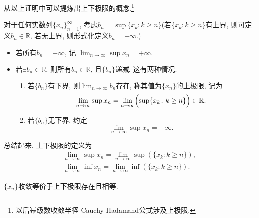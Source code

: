从以上证明中可以提炼出上下极限的概念.\footnote{以后幂级数收敛半径 Cauchy-Hadamand公式涉及上极限.}
\begin{definition}
    对于任何实数列$\{ x_n \}_{n=1}^{\infty}$, 考虑$b_n = \sup \{ x_k\colon k\ge n \}$(若$\{ x_k \colon k\ge n \}$有上界, 则可定义$b_n \in \mathbb{R}$, 若无上界, 则形式化定义$b_n = +\infty$.)
    \begin{itemize}
        \item 若所有$b_n = +\infty$, 记 $\displaystyle  \lim_{n \to \infty} \sup x_n = +\infty$.
        \item 若$\exists  b_n \in  \mathbb{R}$, 则所有$b_n \in  \mathbb{R}$, 且$\{ b_n \}$递减. 这有两种情况.
        \begin{enumerate}
            \item 若$\{ b_n \}$有下界, 则$\displaystyle \lim_{n \to \infty} b_n$存在, 称其值为$\{ x_n \}$的上极限, 记为
            \begin{equation}
              \lim_{n \to \infty} \sup x_n = \lim_{n \to \infty} \Bigl( \sup \{ x_k \colon k\ge n \} \Bigr) \in  \mathbb{R}.
            \end{equation}

            \item 若$\{ b_n \}$无下界, 约定
            \begin{equation}
              \lim_{n \to \infty} \sup x_n = -\infty.
            \end{equation}
        \end{enumerate}
    \end{itemize}
    总结起来, 上下极限的定义为
    \begin{gather}
        \lim_{n \to \infty} \sup x_n = \lim_{n \to \infty} \sup \left( \{ x_k \colon k\ge n \} \right) ,
        \\
        \lim_{n \to \infty} \inf x_n = \lim_{n \to \infty} \inf \left( \{ x_k \colon k\ge n \} \right) .
    \end{gather}
\end{definition}

\begin{proposition}
    $\{ x_n \}$收敛等价于上下极限存在且相等.
\end{proposition}

